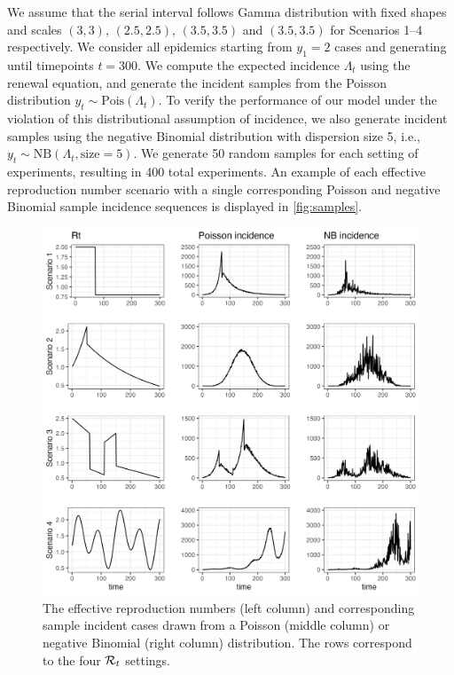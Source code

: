We assume that the serial interval follows Gamma distribution with fixed shapes
and scales $(3,3)$, $(2.5,2.5)$, $(3.5,3.5)$ and $(3.5,3.5)$ for Scenarios 1--4
respectively. We consider all epidemics starting from $y_1=2$ cases and
generating until timepoints $t=300$. We compute the expected incidence
$\Lambda_t$ using the renewal equation, and generate the incident samples from
the Poisson distribution $y_t\sim \textrm{Pois}(\Lambda_t)$. To verify the
performance of our model under the violation of this distributional assumption
of incidence, we also generate incident samples using the negative Binomial
distribution with dispersion size 5, i.e., $y_t\sim \textrm{NB}(\Lambda_t,
\textrm{size}=5)$. We generate 50 random samples for each setting of
experiments, resulting in 400 total experiments. An example of each effective
reproduction number scenario with a single corresponding Poisson and negative
Binomial sample incidence sequences is displayed in \autoref{fig:samples}. 

\begin{figure}[hp!]
    \centering
    \includegraphics[width=.9\textwidth]{fig/plot_samples.png}
    \caption{The effective reproduction numbers (left column) and corresponding
    sample incident cases drawn from a  Poisson (middle column) or negative
    Binomial (right column) distribution. The rows correspond to the four
    $\mathcal{R}_t$ settings.} 
    \label{fig:samples}
\end{figure}

